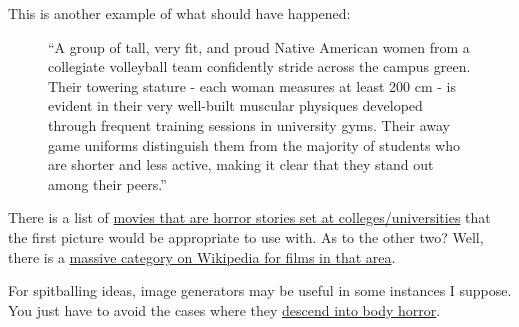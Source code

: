This is another example of what should have happened:

\begin{figure}
\centering
{}
\caption{``A group of tall, very fit, and proud Native American women
from a collegiate volleyball team confidently stride across the campus
green. Their towering stature - each woman measures at least 200 cm - is
evident in their very well-built muscular physiques developed through
frequent training sessions in university gyms. Their away game uniforms
distinguish them from the majority of students who are shorter and less
active, making it clear that they stand out among their peers.''}
\end{figure}

There is a list of
\href{https://en.wikipedia.org/w/index.php?title=List_of_horror_films_set_in_academic_institutions&oldid=1203533874}{movies
that are horror stories set at colleges/universities} that the first
picture would be appropriate to use with. As to the other two? Well,
there is a
\href{https://en.wikipedia.org/wiki/Category:Films_set_in_universities_and_colleges}{massive
category on Wikipedia for films in that area}.

For spitballing ideas, image generators may be useful in some instances
I suppose. You just have to avoid the cases where they
\href{https://en.wikipedia.org/w/index.php?title=Body_horror&oldid=1202000608}{descend
into body horror}.
